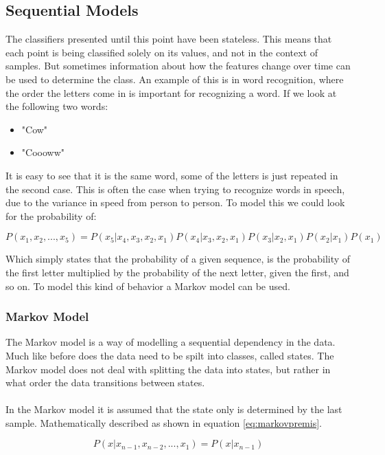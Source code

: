 \subsection{Sequential Models}
The classifiers presented until this point have been stateless. This means that each point is being classified solely on its values, and not in the context of samples. But sometimes information about how the features change over time can be used to determine the class. An example of this is in word recognition, where the order the letters come in is important for recognizing a word.  If we look at the following two words:

\begin{itemize}
  \item "Cow"
  \item "Coooww"
\end{itemize}

It is easy to see that it is the same word, some of the letters is just repeated in the second case. This is often the case when trying to recognize words in speech, due to the variance in speed from person to person. To model this we could look for the probability of: 

\begin{equation}
 P(x_1, x_2, ..., x_5) = P(x_5| x_4,x_3,x_2, x_1) P(x_4| x_3,x_2, x_1) P(x_3|x_2, x_1) P(x_2|x_1) P(x_1)
 \label{eq:seqmodel}
\end{equation}

Which simply states that the probability of a given sequence, is the probability of the first letter multiplied by the probability of the next letter, given the first, and so on. To model this kind of behavior a Markov model can be used.

\subsubsection{Markov Model}
The Markov model is a way of modelling a sequential dependency in the data. Much like before does the data need to be spilt into classes, called states. The Markov model does not deal with splitting the data into states, but rather in what order the data transitions between states.\\\ \\

In the Markov model it is assumed that the state only is determined by the last sample. Mathematically described as shown in equation \ref{eq:markovpremis}.

\begin{equation}
 P(x| x_{n-1}, x_{n-2}, ..., x_1) = P(x| x_{n-1}) 
 \label{eq:markovpremis}
\end{equation}

